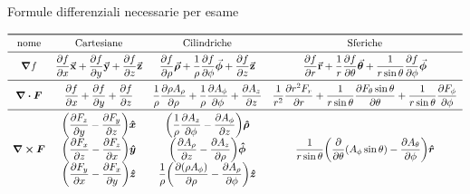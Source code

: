 \documentclass[a4paper]{scrarticle}
\begin{document}
\begin{sidewaystable}
\caption{Formule differenziali necessarie per esame}
    \[
\begin{array}{cccc}
    \toprule
    \text{nome} & \text{Cartesiane} & \text{Cilindriche} & \text{Sferiche}\\
\midrule
\displaystyle \grad{f} & 
    \displaystyle \pdv{f}{x} \va x + \pdv{f}{y} \va y + \pdv{f}{z} \va z &
    \displaystyle \pdv{f}{\rho} \va {\bm \rho} + \frac{1}{\rho}\pdv{f}{\phi}\va {\bm\phi} + \pdv{f}{z} \va z &
    \displaystyle \pdv{f}{r} \va r + \frac{1}{r} \pdv{f}{\theta} \va {\bm\theta} + \frac{1}{r\sin{\theta}} \pdv{f}{\phi} \va{\bm \phi}\\ 
\midrule
\displaystyle \div{\bm{F}} &
    \displaystyle \pdv{f}{x} + \pdv{f}{y} + \pdv{f}{z} &
    \displaystyle \frac{1}{\rho} \pdv{ \rho A_\rho } { \rho}
    + \frac{1} {\rho}\pdv {A_\phi} {\phi}
    + \pdv{ A_z} {z}&
    \displaystyle \frac{1}{r^2} \pdv{r^2 F_r}{r} + \frac{1}{r \sin \theta} \pdv{F_{\theta} \sin \theta}{\theta} + \frac{1}{ r \sin \theta}\pdv{F_{\phi}}{\phi}\\ 
\midrule
\displaystyle \curl{\bm{F}} & 
\begin{matrix}
    \displaystyle \bigg(\pdv{F_z}{y} - \pdv{F_y}{z} \bigg) \boldsymbol{\hat x}\\
    \displaystyle \bigg(\pdv{F_x}{z} - \pdv{F_z}{x}\bigg) \boldsymbol{\hat y}\\
    \displaystyle \bigg(\pdv{F_y}{x} - \pdv{F_x}{y}\bigg) \boldsymbol{\hat z}
\end{matrix} & 
\begin{matrix}
    \displaystyle \bigg (\frac{1 }{ \rho}\pdv{ A_z }{ \phi}
    - \pdv{A_\phi }{  z} \bigg ) \boldsymbol{\hat \rho}  \\
    \displaystyle \bigg (\pdv{A_\rho }{z} - \pdv{A_z }{\rho} \bigg) \boldsymbol{\hat \phi} \\
    \displaystyle \frac{1 }{ \rho}\bigg (\pdv{( \rho A_\phi ) }{\rho}
    - \pdv{A_\rho}{\phi} \bigg ) \boldsymbol{\hat z}
\end{matrix} &
\begin{matrix}
    \displaystyle \frac{1}{ r\sin\theta} \bigg (\frac{\partial }{ \partial \theta} ( A_\phi\sin\theta )
    - \frac{\partial A_\theta }{ \partial \phi} \bigg ) \boldsymbol{\hat r} \\

\end{matrix}
\end{array}\]
\end{sidewaystable}
\end{document}
